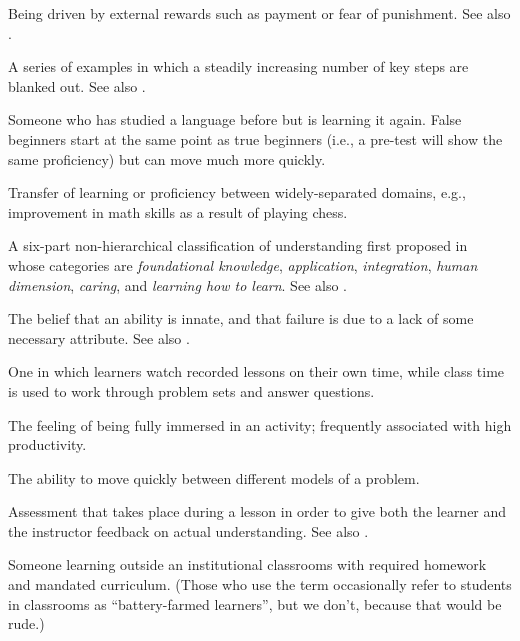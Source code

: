 \begin{description}
 Being driven by external
rewards such as payment or fear of punishment. See
also .

 A series of examples in which a steadily
increasing number of key steps are blanked out. See
also .

 Someone who has studied a language
before but is learning it again. False beginners start at the same point as true
beginners (i.e., a pre-test will show the same proficiency) but can move much
more quickly.

 Transfer of learning or proficiency
between widely-separated domains, e.g., improvement in math skills as a result
of playing chess.

 A six-part non-hierarchical
classification of understanding first proposed in~\cite{Fink2013} whose
categories are \emph{foundational knowledge}, \emph{application},
\emph{integration}, \emph{human dimension}, \emph{caring}, and \emph{learning
  how to learn}. See also .

 The belief that an ability is innate,
and that failure is due to a lack of some necessary attribute. See also
.

 One in which learners watch
recorded lessons on their own time, while class time is used to work through
problem sets and answer questions.

 The feeling of being fully immersed in an activity;
frequently associated with high productivity.

 The ability to move
quickly between different models of a problem.

 Assessment that takes
place during a lesson in order to give both the learner and the instructor
feedback on actual understanding. See
also .

 Someone learning outside an
institutional classrooms with required homework and mandated curriculum. (Those
who use the term occasionally refer to students in classrooms as
``battery-farmed learners'', but we don't, because that would be rude.)


\end{description}
